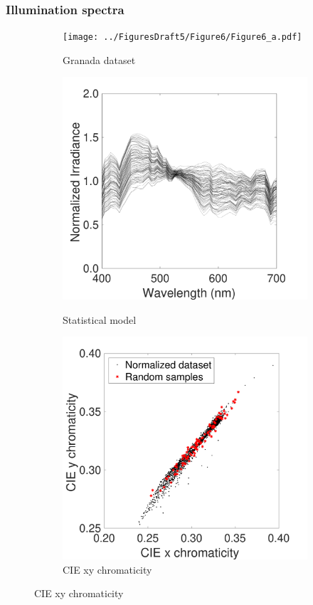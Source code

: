 \documentclass{jov}
\begin{document}
\subsubsection{Illumination spectra}
\begin{figure}
\centering
    \begin{subfigure}[b]{0.24 \textwidth}
    \centering
	\caption{Granada dataset}
        \texttt{[image: ../FiguresDraft5/Figure6/Figure6\_a.pdf]}
        \label{fig:granadaData}
    \end{subfigure}
	\begin{subfigure}[b]{0.24 \textwidth}
    \centering
        \caption{Statistical model}
        \includegraphics[width=\textwidth]{../FiguresDraft5/Figure6/Figure6_b.pdf}
        \label{fig:illuminantSamples}
    \end{subfigure}
      	\begin{subfigure}[b]{0.24 \textwidth}
    \centering
        \caption{CIE xy chromaticity}
        \includegraphics[width=\textwidth]{../FiguresDraft5/Figure6/Figure6_c.pdf}

\end{subfigure}
\end{figure}
\end{document}
